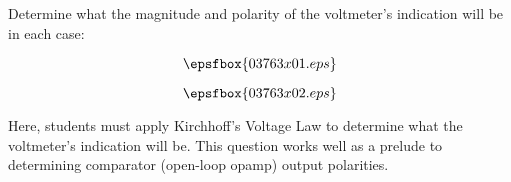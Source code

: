 

Determine what the magnitude and polarity of the voltmeter's indication will be in each case:

$$\epsfbox{03763x01.eps}$$







$$\epsfbox{03763x02.eps}$$







Here, students must apply Kirchhoff's Voltage Law to determine what the voltmeter's indication will be.  This question works well as a prelude to determining comparator (open-loop opamp) output polarities.




